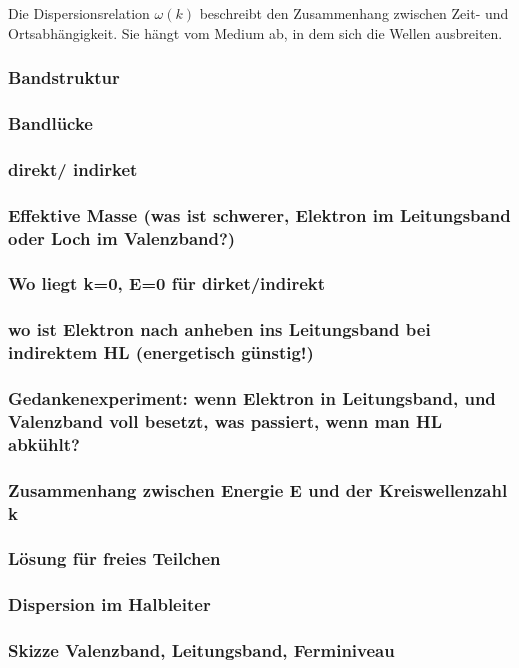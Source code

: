 Die Dispersionsrelation $\omega(k)$ beschreibt den Zusammenhang zwischen Zeit- und Ortsabh\"angigkeit.
Sie h\"angt vom Medium ab, in dem sich die Wellen ausbreiten.

\subsubsection{Bandstruktur}
\subsubsection{Bandlücke}
\subsubsection{direkt/ indirket}
\subsubsection{Effektive Masse (was ist schwerer, Elektron im Leitungsband oder Loch im Valenzband?)}
\subsubsection{Wo liegt k=0, E=0 für dirket/indirekt}
\subsubsection{wo ist Elektron nach anheben ins Leitungsband bei indirektem HL (energetisch günstig!)}
\subsubsection{Gedankenexperiment: wenn Elektron in Leitungsband, und Valenzband voll besetzt, was passiert, wenn man HL abkühlt?}

\subsubsection{Zusammenhang zwischen Energie E und der Kreiswellenzahl k}
\subsubsection{Lösung für freies Teilchen}
\subsubsection{Dispersion im Halbleiter}

\subsubsection{Skizze Valenzband, Leitungsband, Ferminiveau}
